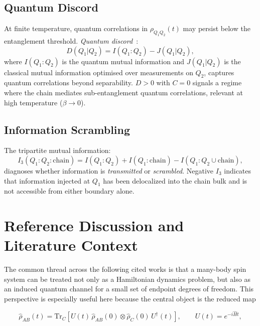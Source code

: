 \documentclass[12pt,a4paper]{article}
\newcommand{\Ham}{\hat{H}}
\newcommand{\rhohat}{\hat{\rho}}
\renewcommand{\Tr}{\mathrm{Tr}}
\begin{document}
\subsection{Quantum Discord}

At finite temperature, quantum correlations in $\rho_{Q_1 Q_2}(t)$ may persist
below the entanglement threshold. \emph{Quantum discord}~\cite{Ollivier2001,Henderson2001}:
\begin{equation}
    D(Q_1|Q_2) = I(Q_1:Q_2) - J(Q_1|Q_2),
\end{equation}
where $I(Q_1:Q_2)$ is the quantum mutual information and $J(Q_1|Q_2)$ is the
classical mutual information optimised over measurements on $Q_2$, captures
quantum correlations beyond separability. $D > 0$ with $C = 0$ signals a regime
where the chain mediates sub-entanglement quantum correlations, relevant at high
temperature ($\beta \to 0$).

\subsection{Information Scrambling}

The tripartite mutual information:
\begin{equation}
    I_3(Q_1 : Q_2 : \mathrm{chain})
    = I(Q_1:Q_2) + I(Q_1:\mathrm{chain}) - I(Q_1: Q_2 \cup \mathrm{chain}),
\end{equation}
diagnoses whether information is \emph{transmitted} or \emph{scrambled}.
Negative $I_3$ indicates that information injected at $Q_1$ has been delocalized
into the chain bulk and is not accessible from either boundary alone.


\section{Reference Discussion and Literature Context}
\label{app:references_discussion}

The common thread across the following cited works is that a
many-body spin system can be treated not only as a Hamiltonian dynamics problem, but also as an induced quantum channel for a small set of endpoint degrees of freedom.  This perspective is especially useful here because the central object is the reduced map

\begin{equation}
  \rhohat_{AB}(t)
  = \Tr_C\!\left[U(t)\,\rhohat_{AB}(0)\otimes\rhohat_C(0)\,U^\dagger(t)\right],
  \qquad U(t)=e^{-i\Ham t},
  \label{app:reduced_map_context}
\end{equation}
\end{document}
